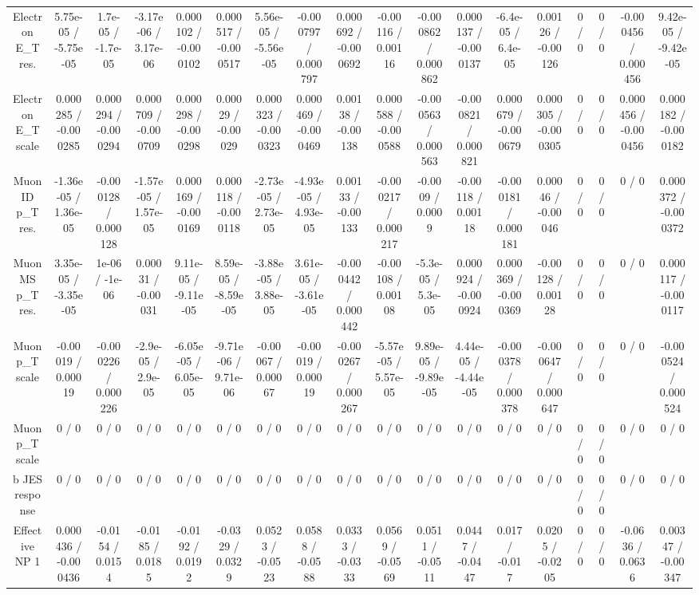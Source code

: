\documentclass[10pt]{article}
\begin{document}
\begin{table}[htbp]
\begin{center}
\begin{tabular}{|c|c|c|c|c|c|c|c|c|c|c|c|c|c|c|c|c|c|}
  Electron E_{T} res. & 5.75e-05 / -5.75e-05 & 1.7e-05 / -1.7e-05 & -3.17e-06 / 3.17e-06 & 0.000102 / -0.000102 & 0.000517 / -0.000517 & 5.56e-05 / -5.56e-05 & -0.000797 / 0.000797 & 0.000692 / -0.000692 & -0.00116 / 0.00116 & -0.000862 / 0.000862 & 0.000137 / -0.000137 & -6.4e-05 / 6.4e-05 & 0.00126 / -0.00126 & 0 / 0 & 0 / 0 & -0.000456 / 0.000456 & 9.42e-05 / -9.42e-05 \\ 
  Electron E_{T} scale & 0.000285 / -0.000285 & 0.000294 / -0.000294 & 0.000709 / -0.000709 & 0.000298 / -0.000298 & 0.00029 / -0.00029 & 0.000323 / -0.000323 & 0.000469 / -0.000469 & 0.00138 / -0.00138 & 0.000588 / -0.000588 & -0.000563 / 0.000563 & -0.000821 / 0.000821 & 0.000679 / -0.000679 & 0.000305 / -0.000305 & 0 / 0 & 0 / 0 & 0.000456 / -0.000456 & 0.000182 / -0.000182 \\ 
  Muon ID p_{T} res. & -1.36e-05 / 1.36e-05 & -0.000128 / 0.000128 & -1.57e-05 / 1.57e-05 & 0.000169 / -0.000169 & 0.000118 / -0.000118 & -2.73e-05 / 2.73e-05 & -4.93e-05 / 4.93e-05 & 0.00133 / -0.00133 & -0.000217 / 0.000217 & -0.0009 / 0.0009 & -0.00118 / 0.00118 & -0.000181 / 0.000181 & 0.00046 / -0.00046 & 0 / 0 & 0 / 0 & 0 / 0 & 0.000372 / -0.000372 \\ 
  Muon MS p_{T} res. & 3.35e-05 / -3.35e-05 & 1e-06 / -1e-06 & 0.00031 / -0.00031 & 9.11e-05 / -9.11e-05 & 8.59e-05 / -8.59e-05 & -3.88e-05 / 3.88e-05 & 3.61e-05 / -3.61e-05 & -0.000442 / 0.000442 & -0.00108 / 0.00108 & -5.3e-05 / 5.3e-05 & 0.000924 / -0.000924 & 0.000369 / -0.000369 & -0.00128 / 0.00128 & 0 / 0 & 0 / 0 & 0 / 0 & 0.000117 / -0.000117 \\ 
  Muon p_{T} scale & -0.00019 / 0.00019 & -0.000226 / 0.000226 & -2.9e-05 / 2.9e-05 & -6.05e-05 / 6.05e-05 & -9.71e-06 / 9.71e-06 & -0.00067 / 0.00067 & -0.00019 / 0.00019 & -0.000267 / 0.000267 & -5.57e-05 / 5.57e-05 & 9.89e-05 / -9.89e-05 & 4.44e-05 / -4.44e-05 & -0.000378 / 0.000378 & -0.000647 / 0.000647 & 0 / 0 & 0 / 0 & 0 / 0 & -0.000524 / 0.000524 \\ 
  Muon p_{T} scale & 0 / 0 & 0 / 0 & 0 / 0 & 0 / 0 & 0 / 0 & 0 / 0 & 0 / 0 & 0 / 0 & 0 / 0 & 0 / 0 & 0 / 0 & 0 / 0 & 0 / 0 & 0 / 0 & 0 / 0 & 0 / 0 & 0 / 0 \\ 
  b JES response & 0 / 0 & 0 / 0 & 0 / 0 & 0 / 0 & 0 / 0 & 0 / 0 & 0 / 0 & 0 / 0 & 0 / 0 & 0 / 0 & 0 / 0 & 0 / 0 & 0 / 0 & 0 / 0 & 0 / 0 & 0 / 0 & 0 / 0 \\ 
  Effective NP 1 & 0.000436 / -0.000436 & -0.0154 / 0.0154 & -0.0185 / 0.0185 & -0.0192 / 0.0192 & -0.0329 / 0.0329 & 0.0523 / -0.0523 & 0.0588 / -0.0588 & 0.0333 / -0.0333 & 0.0569 / -0.0569 & 0.0511 / -0.0511 & 0.0447 / -0.0447 & 0.017 / -0.017 & 0.0205 / -0.0205 & 0 / 0 & 0 / 0 & -0.0636 / 0.0636 & 0.00347 / -0.00347 \\ 

\end{tabular}
\end{center}
\end{table}
\end{document}
